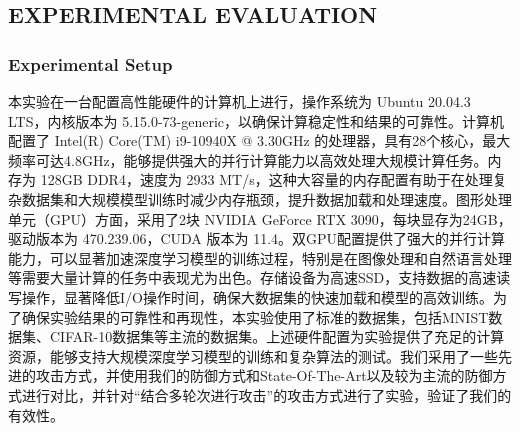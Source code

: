 \documentclass[lettersize,journal]{IEEEtran}
\begin{document}


\subsection{EXPERIMENTAL EVALUATION}

\subsubsection{Experimental Setup}

本实验在一台配置高性能硬件的计算机上进行，操作系统为 Ubuntu 20.04.3 LTS，内核版本为 5.15.0-73-generic，以确保计算稳定性和结果的可靠性。计算机配置了 Intel(R) Core(TM) i9-10940X @ 3.30GHz 的处理器，具有28个核心，最大频率可达4.8GHz，能够提供强大的并行计算能力以高效处理大规模计算任务。内存为 128GB DDR4，速度为 2933 MT/s，这种大容量的内存配置有助于在处理复杂数据集和大规模模型训练时减少内存瓶颈，提升数据加载和处理速度。图形处理单元（GPU）方面，采用了2块 NVIDIA GeForce RTX 3090，每块显存为24GB，驱动版本为 470.239.06，CUDA 版本为 11.4。双GPU配置提供了强大的并行计算能力，可以显著加速深度学习模型的训练过程，特别是在图像处理和自然语言处理等需要大量计算的任务中表现尤为出色。存储设备为高速SSD，支持数据的高速读写操作，显著降低I/O操作时间，确保大数据集的快速加载和模型的高效训练。为了确保实验结果的可靠性和再现性，本实验使用了标准的数据集，包括MNIST数据集、CIFAR-10数据集等主流的数据集。上述硬件配置为实验提供了充足的计算资源，能够支持大规模深度学习模型的训练和复杂算法的测试。我们采用了一些先进的攻击方式，并使用我们的防御方式和State-Of-The-Art以及较为主流的防御方式进行对比，并针对“结合多轮次进行攻击”的攻击方式进行了实验，验证了我们的有效性。
\end{document}
